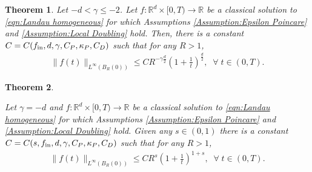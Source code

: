 \documentclass[12pt,american]{amsart}
\numberwithin{equation}{section}
\theoremstyle{plain}
\newtheorem{thm}{Theorem}[section]
\theoremstyle{definition}                  %
\def\fin{f_{\textnormal{in}}}
\begin{document}
\begin{thm}\label{thm:very soft potentials estimate}  
  Let $-d< \gamma \leq -2$. Let $f:\mathbb{R}^d\times [0,T)\to\mathbb{R}$ be a classical solution to \eqref{eqn:Landau homogeneous} for which Assumptions \ref{Assumption:Epsilon Poincare} and \ref{Assumption:Local Doubling} hold. Then, there is a constant $C=C(\fin,d,\gamma,C_P,\kappa_P,C_D)$ such that for any $R>1$,
  \begin{align*}
    \|f(t)\|_{L^\infty(B_R(0))} \leq CR^{-\gamma\tfrac{d}{2}}\left (1+\frac{1}{t}\right )^{\frac{d}{2}},\;\;\forall\;t\in(0,T).
  \end{align*}	  
  
\end{thm}


  \begin{thm}\label{thm:Coulomb case good estimate} 
  
  Let $\gamma =-d$ and $f:\mathbb{R}^d\times [0,T)\to\mathbb{R}$ be a classical solution to \eqref{eqn:Landau homogeneous} for which Assumptions \ref{Assumption:Epsilon Poincare} and \ref{Assumption:Local Doubling} hold. Given any $s \in (0,1)$ there is a constant $C=C(s, \fin,d,\gamma,C_P,\kappa_P,C_D)$ such that for any $R>1$,
  \begin{align*}
    \|f(t)\|_{L^\infty(B_R(0))} \leq C R^s\left (1+\frac{1}{t}\right )^{1+s},\;\;\forall\;t\in(0,T).
  \end{align*}	  
\end{thm}
\end{document}
